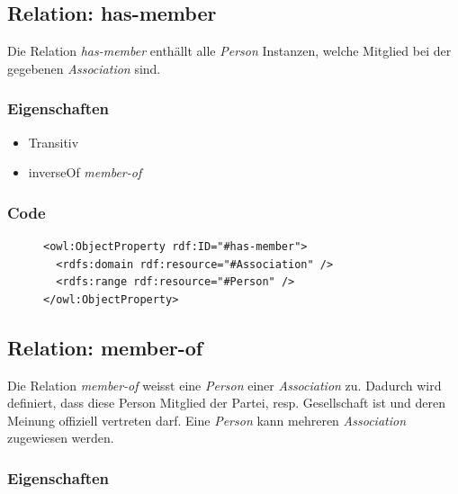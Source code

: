 \documentclass[
    11pt,
    latin1,
    a4paper,
    oneside
]{scrreprt}
\begin{document}
\subsection{Relation: has-member} \label{sec:rel_hasmember}

Die Relation \emph{has-member} enth\"allt alle \emph{Person} Instanzen, welche Mitglied bei der gegebenen \emph{Association} sind.

\subsubsection{Eigenschaften} \label{sec:rel_hasmember_settings}

\begin{itemize}
  \item Transitiv
  \item inverseOf \emph{member-of}
\end{itemize}

\subsubsection{Code} \label{sec:rel_hasmember_code}

\begin{figure}[H]
 \lstset{language=XML}
 \begin{lstlisting}[label=owl:ahsmember,caption={Die Relation \emph{has-member} enth\"allt alle Mitglieder der \emph{Association}}]
<owl:ObjectProperty rdf:ID="#has-member">
  <rdfs:domain rdf:resource="#Association" />
  <rdfs:range rdf:resource="#Person" />
</owl:ObjectProperty>
 \end{lstlisting}
\end{figure}


\subsection{Relation: member-of} \label{sec:rel_memberof}

Die Relation \emph{member-of} weisst eine \emph{Person} einer \emph{Association} zu. Dadurch wird definiert, dass diese Person Mitglied der Partei, resp. Gesellschaft ist und deren Meinung offiziell vertreten darf. Eine \emph{Person} kann mehreren \emph{Association} zugewiesen werden.

\subsubsection{Eigenschaften} \label{sec:rel_memberof_settings}
\end{document}
